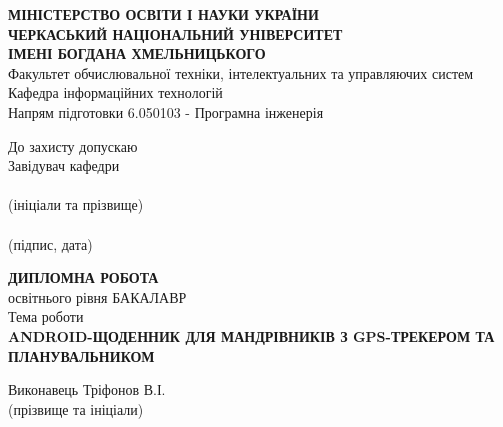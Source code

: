 \documentclass[../main.tex]{subfiles}
\begin{document}
	
	\begin{titlepage}
		\centering
		{\bfseries\large
			\MakeUppercase{Міністерство освіти і науки України} \\
			\MakeUppercase{Черкаський національний університет} \\
			\MakeUppercase{імені Богдана Хмельницького} \\}
		Факультет обчислювальної техніки, інтелектуальних та управляючих систем \\
		Кафедра інформаційних технологій \\
		Напрям підготовки 6.050103 - Програмна інженерія \\
		\begin{flushright}
			\begin{minipage}[t]{5cm}
				\begin{flushright}
					\footnotesize
					До захисту допускаю \\
					Завідувач кафедри \\
					\hrulefill \\
					{\centering (ініціали та прізвище) \\ }
					\hrulefill \\
					{\centering (підпис, дата) \\ }
				\end{flushright}
			\end{minipage}
		\end{flushright}
		{\scshape\bfseries \MakeUppercase{Дипломна робота} \\}
		освітнього рівня БАКАЛАВР \\
		Тема роботи \\
		{\scshape\bfseries \MakeUppercase{Android-щоденник для мандрівників з GPS-трекером та планувальником} \\}
		\vspace{\baselineskip}
		{\footnotesize
			\begin{flushright}
				\begin{minipage}[t]{4.2cm}
					\begin{flushright}
						Виконавець Тріфонов В.І. \\
						(прізвище та ініціали) \\
					\end{flushright}
				\end{minipage}
			\end{flushright}
			\begin{flushright}
				\begin{minipage}[t]{6.8cm}
					\begin{flushright}

\end{flushright}
\end{minipage}
\end{flushright}}
\end{titlepage}
\end{document}
